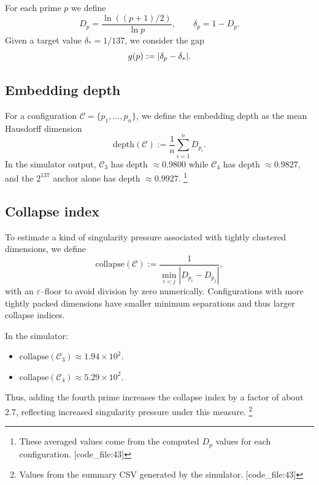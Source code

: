 \documentclass[11pt]{article}
\begin{document}
For each prime $p$ we define
\begin{equation}
  D_p = \frac{\ln((p+1)/2)}{\ln p}, \qquad
  \delta_p = 1 - D_p.
\end{equation}
Given a target value $\delta_\ast = 1/137$, we consider the gap
\begin{equation}
  g(p) := \abs{\delta_p - \delta_\ast}.
\end{equation}

\subsection{Embedding depth}

For a configuration $\mathcal{C} = \{p_1,\dots,p_n\}$, we define the embedding depth as the mean Hausdorff dimension
\begin{equation}
  \mathrm{depth}(\mathcal{C}) 
    := \frac{1}{n}\sum_{i=1}^n D_{p_i}.
\end{equation}
In the simulator output, $\mathcal{C}_3$ has depth $\approx 0.9800$ while $\mathcal{C}_4$ has depth $\approx 0.9827$, and the $2^{137}$ anchor alone has depth $\approx 0.9927$.%
\footnote{These averaged values come from the computed $D_p$ values for each configuration. [code\_file:43]} 

\subsection{Collapse index}

To estimate a kind of singularity pressure associated with tightly clustered dimensions, we define
\begin{equation}
  \mathrm{collapse}(\mathcal{C}) 
    := \frac{1}{\min_{i<j}|D_{p_i} - D_{p_j}|},
\end{equation}
with an $\varepsilon$--floor to avoid division by zero numerically. Configurations with more tightly packed dimensions have smaller minimum separations and thus larger collapse indices.

In the simulator:
\begin{itemize}
  \item $\mathrm{collapse}(\mathcal{C}_3) \approx 1.94\times 10^2$.
  \item $\mathrm{collapse}(\mathcal{C}_4) \approx 5.29\times 10^2$.
\end{itemize}
Thus, adding the fourth prime increases the collapse index by a factor of about $2.7$, reflecting increased singularity pressure under this measure.%
\footnote{Values from the summary CSV generated by the simulator. [code\_file:43]} 
\end{document}
